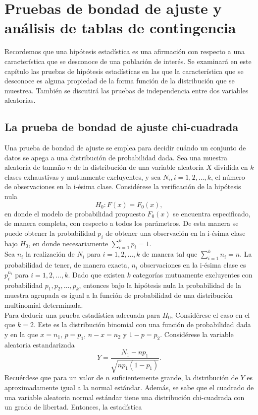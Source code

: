 \chapter{Pruebas de bondad de ajuste y análisis de tablas de contingencia}
Recordemos que una hipótesis estadística es una afirmación con respecto a una característica que se desconoce de una población de interés. Se examinará en este capítulo las pruebas de hipótesis estadísticas en las que la característica que se desconoce es alguna propiedad de la forma función de la distribución que se muestrea. También se discutirá las pruebas de independencia entre dos variables aleatorias. 

\section{La prueba de bondad de ajuste chi-cuadrada}
Una prueba de bondad de ajuste se emplea para decidir cuándo un conjunto de datos se apega a una distribución de probabilidad dada. Sea una muestra aleatoria de tamaño $n$ de la distribución de una variable aleatoria $X$ dividida en $k$ clases exhaustivas y mutuamente excluyentes, y sea $N_i, i=1,2,\ldots,k$, el número de observaciones en la i-ésima clase. Considérese la verificación de la hipótesis nula
$$H_0:F(x)=F_0(x),$$
en donde el modelo de probabilidad propuesto $F_0(x)$ se encuentra especificado, de manera completa, con respecto a todos los parámetros. De esta manera se puede obtener la probabilidad $p_i$ de obtener una observación en la i-ésima clase bajo $H_0$, en donde necesariamente $\sum_{i=1}^k p_i=1.$\\
Sea $n_i$ la realización de $N_i$ para $i=1,2,\ldots,k$ de manera tal que $\sum_{i=1}^k n_i=n$. La probabilidad de tener, de manera exacta, $n_i$ observaciones en la i-ésima clase es $p_i^{n_i}$ para $i=1,2,\ldots,k$. Dado que existen $k$ categorías mutuamente excluyentes con probabilidad $p_1,p_2,\ldots,p_k$, entonces bajo la hipótesis nula la probabilidad de la muestra agrupada es igual a la función de probabilidad de una distribución multinomial determinada.\\
Para deducir una prueba estadística adecuada para $H_0$, Considérese el caso en el que $k=2$. Este es la distribución binomial con una función de probabilidad dada y en la que $x=n_1$, $p=p_1$, $n-x=n_2$ y $1-p=p_2$. Considérese la variable aleatoria estandarizada 
$$Y=\dfrac{N_1-np_1}{\sqrt{np_1(1-p_1)}}.$$
Recuérdese que para un valor de $n$ suficientemente grande, la distribución de $Y$ es aproximadamente igual a la normal estándar. Además, se sabe que el cuadrado de una variable aleatoria normal estándar tiene una distribución chi-cuadrada con un grado de libertad. Entonces, la estadística
